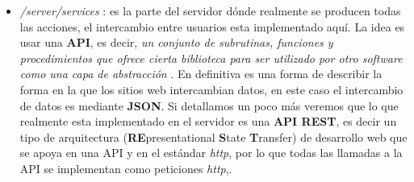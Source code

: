 \begin{itemize}
\begin{landscape}
  \end{landscape}

\item\emph{/server/services} : 	es la parte del servidor dónde realmente se producen todas las acciones, el intercambio entre usuarios esta implementado aquí. La idea es usar una \textbf{API}, es decir, \emph{un conjunto de subrutinas, funciones y procedimientos que ofrece cierta biblioteca para ser utilizado por otro software como una capa de abstracción} \cite{wikiapi}. En definitiva es una forma de describir la forma en la que los sitios web intercambian datos, en este caso el intercambio de datos es mediante \textbf{JSON}. Si detallamos un poco más veremos que lo que realmente esta implementado en el servidor es una \textbf{API REST}, es decir un tipo de arquitectura (\textbf{RE}presentational \textbf{S}tate \textbf{T}ransfer) de desarrollo web que se apoya en una API y en el estándar \emph{http}, por lo que todas las llamadas a la API se implementan como peticiones \emph{http},.
	
	
	
\end{itemize}



\begin{landscape}

  \end{landscape}

